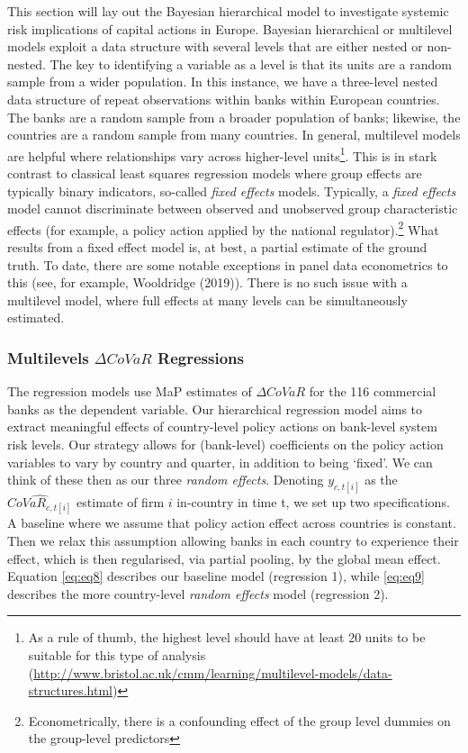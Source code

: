 \documentclass[
  10pt,
]{article}
\begin{document}
This section will lay out the Bayesian hierarchical model to investigate
systemic risk implications of capital actions in Europe. Bayesian
hierarchical or multilevel models exploit a data structure with several
levels that are either nested or non-nested. The key to identifying a
variable as a level is that its units are a random sample from a wider
population. In this instance, we have a three-level nested data
structure of repeat observations within banks within European countries.
The banks are a random sample from a broader population of banks;
likewise, the countries are a random sample from many countries. In
general, multilevel models are helpful where relationships vary across
higher-level units\footnote{As a rule of thumb, the highest level should
  have at least 20 units to be suitable for this type of analysis
  (\url{http://www.bristol.ac.uk/cmm/learning/multilevel-models/data-structures.html})}.
This is in stark contrast to classical least squares regression models
where group effects are typically binary indicators, so-called
\emph{fixed effects} models. Typically, a \emph{fixed effects} model
cannot discriminate between observed and unobserved group characteristic
effects (for example, a policy action applied by the national
regulator).\footnote{Econometrically, there is a confounding effect of
  the group level dummies on the group-level predictors} What results
from a fixed effect model is, at best, a partial estimate of the ground
truth. To date, there are some notable exceptions in panel data
econometrics to this (see, for example, Wooldridge (2019)). There is no
such issue with a multilevel model, where full effects at many levels
can be simultaneously estimated.

\hypertarget{multilevels-delta-covar-regressions}{%
\subsubsection{\texorpdfstring{Multilevels \(\Delta CoVaR\)
Regressions}{Multilevels \textbackslash Delta CoVaR Regressions}}\label{multilevels-delta-covar-regressions}}

The regression models use MaP estimates of \(\Delta CoVaR\) for the 116
commercial banks as the dependent variable. Our hierarchical regression
model aims to extract meaningful effects of country-level policy actions
on bank-level system risk levels. Our strategy allows for (bank-level)
coefficients on the policy action variables to vary by country and
quarter, in addition to being `fixed'. We can think of these then as our
three \emph{random effects}. Denoting \(y_{c,t[i]}\) as the
\(\widehat{CoVaR_{c,t[i]}}\) estimate of firm \(i\) in-country in time
t, we set up two specifications. A baseline where we assume that policy
action effect across countries is constant. Then we relax this
assumption allowing banks in each country to experience their effect,
which is then regularised, via partial pooling, by the global mean
effect. Equation \ref{eq:eq8} describes our baseline model (regression
1), while \ref{eq:eq9} describes the more country-level \emph{random
effects} model (regression 2).
\end{document}
